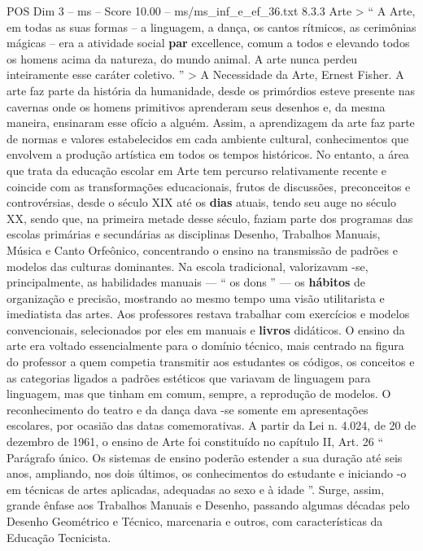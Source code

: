 \begin{textsample}{POS Dim 3 – ms – Score 10.00 – ms/ms\_inf\_e\_ef\_36.txt}  \label{ex:f3_pos_200}
8.3.3 Arte > “ A Arte, em todas as suas formas – a linguagem, a dança, os cantos rítmicos, as cerimônias mágicas – era a atividade social \textbf{par} excellence, comum a todos e elevando todos os homens acima da natureza, do mundo animal.
A arte nunca perdeu inteiramente esse caráter coletivo. ” > A Necessidade da Arte, Ernest Fisher.
A arte faz parte da história da humanidade, desde os primórdios esteve presente nas cavernas onde os homens primitivos aprenderam seus desenhos e, da mesma maneira, ensinaram esse ofício a alguém.
Assim, a aprendizagem da arte faz parte de normas e valores estabelecidos em cada ambiente cultural, conhecimentos que envolvem a produção artística em todos os tempos históricos.
No entanto, a área que trata da educação escolar em Arte tem percurso relativamente recente e coincide com as transformações educacionais, frutos de discussões, preconceitos e controvérsias, desde o século XIX até os \textbf{dias} atuais, tendo seu auge no século XX, sendo que, na primeira metade desse século, faziam parte dos programas das escolas primárias e secundárias as disciplinas Desenho, Trabalhos Manuais, Música e Canto Orfeônico, concentrando o ensino na transmissão de padrões e modelos das culturas dominantes.
Na escola tradicional, valorizavam -se, principalmente, as habilidades manuais — “ os dons ” — os \textbf{hábitos} de organização e precisão, mostrando ao mesmo tempo uma visão utilitarista e imediatista das artes.
Aos professores restava trabalhar com exercícios e modelos convencionais, selecionados por eles em manuais e \textbf{livros} didáticos.
O ensino da arte era voltado essencialmente para o domínio técnico, mais centrado na figura do professor a quem competia transmitir aos estudantes os códigos, os conceitos e as categorias ligados a padrões estéticos que variavam de linguagem para linguagem, mas que tinham em comum, sempre, a reprodução de modelos.
O reconhecimento do teatro e da dança dava -se somente em apresentações escolares, por ocasião das datas comemorativas.
A partir da Lei n. 4.024, de 20 de dezembro de 1961, o ensino de Arte foi constituído no capítulo II, Art. 26 “ Parágrafo único.
Os sistemas de ensino poderão estender a sua duração até seis anos, ampliando, nos dois últimos, os conhecimentos do estudante e iniciando -o em técnicas de artes aplicadas, adequadas ao sexo e à idade ”.
Surge, assim, grande ênfase aos Trabalhos Manuais e Desenho, passando algumas décadas pelo Desenho Geométrico e Técnico, marcenaria e outros, com características da Educação Tecnicista.

\end{textsample}
